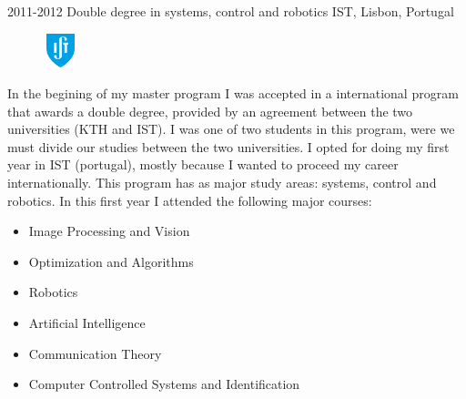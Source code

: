 \documentclass[]{friggeri-cv}
\begin{document}
\begin{entrylist2}
\entrynew
{2011-2012}
{Double degree in systems, control and robotics}
{IST, Lisbon, Portugal}
{
\begin{figure}
	\vspace{-20pt}
	\begin{center}
		\includegraphics[width=1cm,height=1cm]{ist}
	\end{center}
\end{figure}
In the begining of my master program I was accepted in a international program that awards a double degree, provided by an agreement between the two universities (KTH and IST). I was one of two students in this program, were we must divide our studies between the two universities. I opted for doing my first year in IST (portugal), mostly because I wanted to proceed my career internationally. This program has as major study areas: systems, control and robotics. In this first year I attended the following major courses:

\setlength{\columnsep}{0cm}
\begin{multicols}{2}
	\begin{itemize} \itemsep0.5pt \parskip-1pt 
		\item Image Processing and Vision
		\item Optimization and Algorithms
		\item Robotics
	\end{itemize}
	\begin{itemize}
		\item Artificial Intelligence
		\item Communication Theory
		\item Computer Controlled Systems and Identification
	\end{itemize}
\end{multicols}

}
\end{entrylist2}
\end{document}
